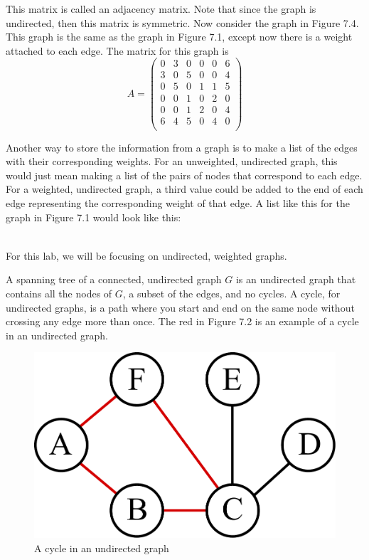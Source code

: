 This matrix is called an adjacency matrix.
Note that since the graph is undirected, then this matrix is symmetric.
Now consider the graph in Figure 7.4.  This graph is the same as the graph in Figure 7.1, except now there is a weight attached to each edge.  The matrix for this graph is
\[
A = \begin{pmatrix}
0 & 3 & 0 & 0 & 0 & 6\\
3 & 0 & 5 & 0 & 0 & 4\\
0 & 5 & 0 & 1 & 1 & 5\\
0 & 0 & 1 & 0 & 2 & 0\\
0 & 0 & 1 & 2 & 0 & 4\\
6 & 4 & 5 & 0 & 4 & 0\\
\end{pmatrix}
\]

Another way to store the information from a graph is to make a list of the edges with their corresponding weights.
For an unweighted, undirected graph, this would just mean making a list of the pairs of nodes that correspond to each edge.
For a weighted, undirected graph, a third value could be added to the end of each edge representing the corresponding weight of that edge.
A list like this for the graph in Figure 7.1 would look like this:

\begin{align*}
[('A', 'B'),
 ('B', 'C'),
 ('B', 'F'),
 ('C', 'D'),\\
 ('C', 'E'),
 ('C', 'F'),
 ('D', 'E'),
 ('E', 'F')]
\end{align*}

For this lab, we will be focusing on undirected, weighted graphs.

A spanning tree of a connected, undirected graph $G$ is an undirected graph that contains all the nodes of $G$, a subset of the edges, and no cycles.
A cycle, for undirected graphs, is a path where you start and end on the same node without crossing any edge more than once.
The red in Figure 7.2 is an example of a cycle in an undirected graph.

\begin{figure}[H]
\includegraphics[width = .4\textwidth]{graph3.pdf}
\caption{A cycle in an undirected graph}
\label{mst:graph3}
\end{figure}

